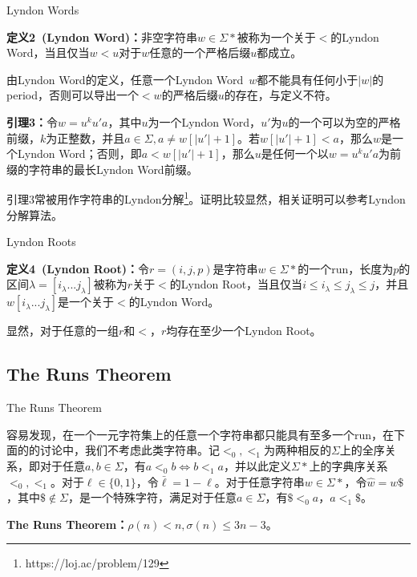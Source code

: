 \documentclass{beamer}
\begin{document}
\begin{frame}{Lyndon Words}
    \par \textbf{定义2\ (Lyndon Word)：}非空字符串$w\in\Sigma*$被称为一个关于$<$的Lyndon Word，当且仅当$w<u$对于$w$任意的一个严格后缀$u$都成立。
    \pause
    \par 由Lyndon Word的定义，任意一个Lyndon Word\ $w$都不能具有任何小于$|w|$的period，否则可以导出一个$<w$的严格后缀$u$的存在，与定义不符。
	\pause
    \par \textbf{引理3：}令$w=u^ku'a$，其中$u$为一个Lyndon Word，$u'$为$u$的一个可以为空的严格前缀，$k$为正整数，并且$a\in\Sigma,a\ne w[|u'|+1]$。若$w[|u'|+1]<a$，那么$w$是一个Lyndon Word；否则，即$a<w[|u'|+1]$，那么$u$是任何一个以$w=u^ku'a$为前缀的字符串的最长Lyndon Word前缀。
	\pause
    \par 引理3常被用作字符串的Lyndon分解\footnote{https://loj.ac/problem/129}。证明比较显然，相关证明可以参考Lyndon分解算法。
\end{frame}

\begin{frame}{Lyndon Roots}
    \par \textbf{定义4\ (Lyndon Root)：}令$r=(i,j,p)$是字符串$w\in\Sigma*$的一个run，长度为$p$的区间$\lambda=[i_{\lambda}...j_{\lambda}]$被称为$r$关于$<$的Lyndon Root，当且仅当$i\leq i_{\lambda}\leq j_{\lambda}\leq j$，并且$w[i_{\lambda}...j_{\lambda}]$是一个关于$<$的Lyndon Word。
    \pause
    \par 显然，对于任意的一组$r$和$<$，$r$均存在至少一个Lyndon Root。
\end{frame}

\subsection{The Runs Theorem}

\begin{frame}{The Runs Theorem}
    \par 容易发现，在一个一元字符集上的任意一个字符串都只能具有至多一个run，在下面的的讨论中，我们不考虑此类字符串。记$<_0,<_1$为两种相反的$\Sigma$上的全序关系，即对于任意$a,b\in\Sigma$，有$a<_0b\Leftrightarrow b<_1a$，并以此定义$\Sigma*$上的字典序关系$<_0,<_1$。对于$\ell\in\{0,1\}$，令$\bar{\ell}=1-\ell$。对于任意字符串$w\in\Sigma*$，令$\hat{w}=w\$$，其中$\$\notin\Sigma$，是一个特殊字符，满足对于任意$a\in\Sigma$，有$\$<_0a$，$a<_1\$$。
    \pause
    \par \textbf{The Runs Theorem：}$\rho(n)<n,\sigma(n)\leq3n-3$。
\end{frame}
\end{document}
